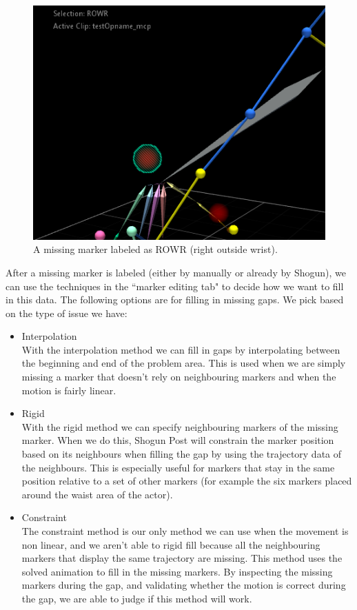 \documentclass{uva-inf-article}
\begin{document}
\begin{figure}[hbt!]
    \centering
    \includegraphics[width=.8\textwidth]{imgs/missingMarker.png}
    \caption{A missing marker labeled as ROWR (right outside wrist).}
    \label{fig:missingmarker}
\end{figure}

After a missing marker is labeled (either by manually or already by Shogun), we can use the techniques in the ``marker editing tab" to decide how we want to fill in this data. The following options are for filling in missing gaps. We pick based on the type of issue we have:
\begin{itemize}
    \item Interpolation\\
    With the interpolation method we can fill in gaps by interpolating between the beginning and end of the problem area. This is used when we are simply missing a marker that doesn't rely on neighbouring markers and when the motion is fairly linear.
    \item Rigid\\
    With the rigid method we can specify neighbouring markers of the missing marker. When we do this, Shogun Post will constrain the marker position based on its neighbours when filling the gap by using the trajectory data of the neighbours. This is especially useful for markers that stay in the same position relative to a set of other markers (for example the six markers placed around the waist area of the actor).
    \item Constraint\\
    The constraint method is our only method we can use when the movement is non linear, and we aren't able to rigid fill because all the neighbouring markers that display the same trajectory are missing. This method uses the solved animation to fill in the missing markers. By inspecting the missing markers during the gap, and validating whether the motion is correct during the gap, we are able to judge if this method will work.
\end{itemize}
\end{document}
